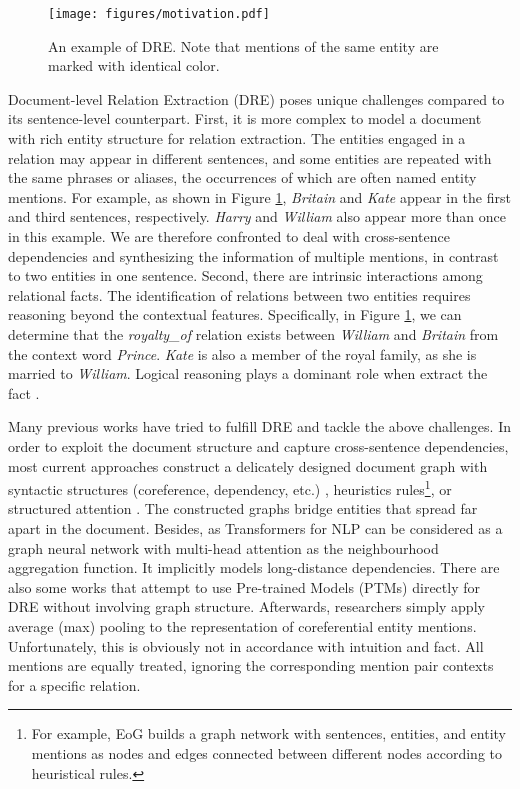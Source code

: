 \documentclass[11pt]{article}
\begin{document}
\begin{figure}[t]
	\begin{center}
		\texttt{[image: figures/motivation.pdf]}
		\caption{An example of DRE. Note that mentions of the same entity are marked with identical color.}
		\label{motivation}
	\end{center}
\end{figure}

Document-level Relation Extraction (DRE) poses unique challenges compared to its sentence-level counterpart.
First, it is more complex to model a document with rich entity structure for relation extraction.
The entities engaged in a relation may appear in different sentences, and some entities are repeated with the same phrases or aliases, the occurrences of which are often named entity mentions.
For example, as shown in Figure \ref{motivation}, \textit{Britain} and \textit{Kate} appear in the first and third sentences, respectively. 
\textit{Harry} and \textit{William} also appear more than once in this example.
We are therefore confronted to deal with cross-sentence dependencies and synthesizing the information of multiple mentions, in contrast to two entities in one sentence.
Second, there are intrinsic interactions among relational facts.
The identification of relations between two entities requires reasoning beyond the contextual features.
Specifically, in Figure \ref{motivation}, we can determine that the \textit{royalty\_of} relation exists between \textit{William} and \textit{Britain} from the context word \textit{Prince}. 
\textit{Kate} is also a member of the royal family, as she is married to \textit{William}.
Logical reasoning plays a dominant role when extract the fact .


Many previous works have tried to fulfill DRE and tackle the above challenges.
In order to exploit the document structure and capture cross-sentence dependencies, most current approaches construct a delicately designed document graph with syntactic structures (coreference, dependency, etc.) \cite{sahu-etal-2019-inter}, heuristics rules\footnote{For example, EoG \cite{christopoulou-etal-2019-connecting} builds a graph network with sentences, entities, and entity mentions as nodes and edges connected between different nodes according to heuristical rules.}, or structured attention \cite{nan-etal-2020-reasoning}.
The constructed graphs bridge entities that spread far apart in the document.
Besides, as Transformers for NLP can be considered as a graph neural network with multi-head attention as the neighbourhood aggregation function. It implicitly models long-distance dependencies.
There are also some works \cite{DBLP:conf/aaai/XuWLZM21,DBLP:conf/aaai/Zhou0M021} that attempt to use Pre-trained Models (PTMs) directly for DRE without involving graph structure.
Afterwards, researchers simply apply average (max) pooling to the representation of coreferential entity mentions.
Unfortunately, this is obviously not in accordance with intuition and fact.
All mentions are equally treated, ignoring the corresponding mention pair contexts for a specific relation.
\end{document}

